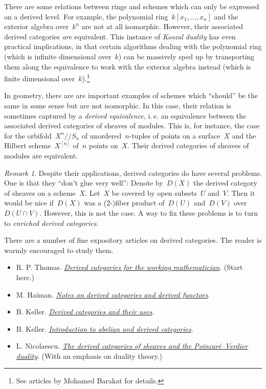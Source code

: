 \documentclass{amsart}
\makeatletter
\theoremstyle{definition}
\theoremstyle{plain}
\theoremstyle{remark}
\newtheorem{rem}[defn]{Remark}
\newcommand{\?}{\,{:}\,}
\renewcommand{\_}{\mathpunct{.}\,}
\newcommand{\ie}{i.\,e.\@\xspace}
\makeatother
\begin{document}
There are some relations between rings and schemes which can only be expressed
on a derived level. For example, the polynomial ring~$k[x_1,\ldots,x_n]$ and
the exterior algebra over~$k^n$ are not at all isomorphic. However, their
associated derived categories \emph{are} equivalent. This instance of \emph{Koszul
duality} has even practical implications, in that certain algorithms dealing
with the polynomial ring (which is infinite dimensional over~$k$) can be
massively sped up by transporting them along the equivalence to work with the
exterior algebra instead (which is finite dimensional over~$k$).\footnote{See
articles by Mohamed Barakat for details.}

In geometry, there are are important examples of schemes which ``should'' be
the same in some sense but are not isomorphic. In this case, their relation is
sometimes captured by a \emph{derived equivalence}, \ie an equivalence between
the associated derived categories of sheaves of modules. This is, for instance,
the case for the orbifold~$X^n/\!\!/S_n$ of unordered~$n$-tuples of points on a
surface~$X$ and the Hilbert scheme~$X^{[n]}$ of~$n$ points on~$X$. Their
derived categories of sheaves of modules are equivalent.

\begin{rem}Despite their applications, derived categories do have several
problems. One is that they ``don't glue very well'': Denote by~$D(X)$ the
derived category of sheaves on a scheme~$X$. Let~$X$ be covered by open
subsets~$U$ and~$V$. Then it would be nice if~$D(X)$ was a (2-)fiber product
of~$D(U)$ and~$D(V)$ over~$D(U \cap V)$. However, this is not the case. A way
to fix these problems is to turn to \emph{enriched derived categories}.
\end{rem}

There are a number of fine expository articles on derived categories. The reader is
warmly encouraged to study them.
\begin{itemize}
\item R. P. Thomas. \href{http://arxiv.org/abs/math/0001045}{\emph{Derived
categories for the working mathematician}}. (Start here.)
\item M. Haiman.
\href{https://math.berkeley.edu/~mhaiman/math256-fall13-spring14/cohomology-1_derived-cat.pdf}{\emph{Notes
on derived categories and derived functors}}.
\item B. Keller.
\href{http://www.maths.ed.ac.uk/~aar/papers/keller.pdf}{\emph{Derived
categories and their uses}}.
\item B. Keller.
\href{http://webusers.imj-prg.fr/~bernhard.keller/publ/cam.pdf}{\emph{Introduction
to abelian and derived categories}}.
\item L. Nicolaescu.
\href{http://www3.nd.edu/~lnicolae/Verdier-ams.pdf}{\emph{The derived
categories of sheaves and the Poincaré--Verdier duality}}. (With an emphasis on
duality theory.)
\end{itemize}
\end{document}
